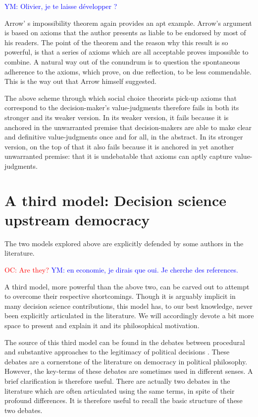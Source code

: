 \documentclass[preprint,11pt]{elsarticle}
\newcommand{\commentYM}[1]{\textcolor{blue}{YM: #1}}
\newcommand{\commentOC}[1]{\textcolor{red}{OC: #1}}
\begin{document}
\commentYM{Olivier, je te laisse développer ?}

Arrow' s  impossibility theorem \cite{arrow_social_2012} again provides an apt example. Arrow's argument is based on axioms that the author presents as liable to be endorsed by most of his readers. The point of the theorem and the reason why this result is so powerful, is that a series of axioms which are all acceptable proves impossible to combine. A natural way out of the conundrum is to question the spontaneous adherence to the axioms, which prove, on due reflection, to be less commendable. This is the way out that Arrow himself suggested.


The above scheme through which social choice theorists pick-up axioms that correspond to the decision-maker's value-judgments therefore fails in both its stronger and its weaker version. In its weaker version, it fails because it is anchored in the unwarranted premise that decision-makers are able to make clear and definitive value-judgments once and for all, in the abstract. In its stronger version, on the top of that it also fails because it is anchored in yet another unwarranted premise: that it is undebatable that axioms can aptly capture value-judgments.

\section{A third model: Decision science upstream democracy}
\noindent The two models explored above are explicitly defended by some authors in the literature. 

\commentOC{ Are they?}
\commentYM{en economie, je dirais que oui. Je cherche des references.} 

A third model, more powerful than the above two, can be carved out to attempt to overcome their respective shortcomings. Though it is arguably implicit in many decision science contributions, this model has, to our best knowledge, never been explicitly articulated in the literature. We will accordingly devote a bit more space to present and explain it and its philosophical motivation.

The source of this third model can be found in the debates between procedural and substantive approaches to the legitimacy of political decisions \cite{meinard_what_2017}. These debates are a cornerstone of the literature on democracy in political philosophy. However, the key-terms of these debates are sometimes used in different senses. A brief clarification is therefore useful. There are actually two debates in the literature which are often articulated using the same terms, in spite of their profound differences. It is therefore useful to recall the basic structure of these two debates.
\end{document}
